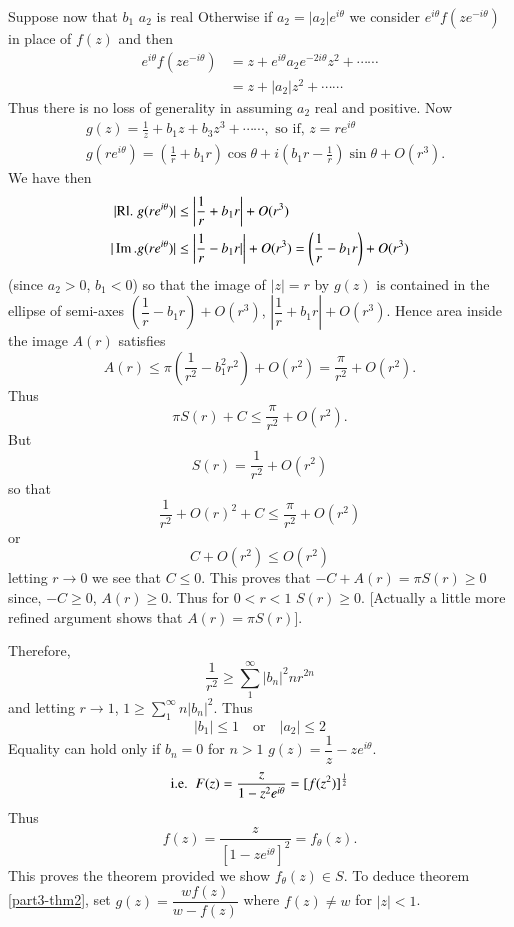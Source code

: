 Suppose now that $b_{1}$ \ie $a_{2}$ is real Otherwise if
$a_{2}=|a_{2}|e^{i\theta}$ we consider $e^{i\theta}f(ze^{-i\theta})$
in place of $f(z)$ and then
\begin{align*}
e^{i\theta}f(ze^{-i\theta})
&=z+e^{i\theta}a_{2}e^{-2i\theta}z^{2}+\cdots\cdots\\
&= z+|a_{2}|z^{2}+\cdots\cdots
\end{align*}
Thus there is no loss of generality in assuming $a_{2}$ real and
positive. Now 
\begin{align*}
& g(z)=\frac{1}{z}+b_{1}z+b_{3}z^{3}+\cdots\cdots,\text{ \  so if, \ }
  z=re^{i\theta}\\
&
  g(re^{i\theta})=\left(\frac{1}{r}+b_{1}r\right)\cos\theta+i\left(b_{1}r-\frac{1}{r}\right)\sin \theta+O(r^{3}).
\end{align*}
We have then
\begin{align*}
|\text{Rl.\;}g(re^{i\theta})| &\leq \left|\frac{1}{r}+b_{1}r \right|+O(r^{3})\\
|\operatorname{Im}. g(re^{i\theta})| &\leq
\left|\frac{1}{r}-b_{1}r
|\right|+O(r^{3})=\left(\frac{1}{r}-b_{1}r\right)+ O(r^{3}) 
\end{align*}
(since $a_{2}>0$, $b_{1}<0$)
so that the image of $|z|=r$ by $g(z)$ is contained in the ellipse of
semi-axes $\left(\dfrac{1}{r}-b_{1}r\right)+O(r^{3})$,
$|\dfrac{1}{r}+b_{1}r|+O(r^{3})$. Hence area inside the image $A(r)$
satisfies
$$
A(r)\leq
\pi\left(\frac{1}{r^{2}}-b^{2}_{1} r^{2}\right) +
O(r^{2})=\frac{\pi}{r^{2}}+O(r^{2}). 
$$
Thus\pageoriginale
$$
\pi S(r)+C\leq \frac{\pi}{r^{2}}+O(r^{2}).
$$
But
$$
S(r)=\frac{1}{r^{2}}+O(r^{2})
$$
so that
$$
\frac{1}{r^{2}}+O(r)^{2}+C\leq \frac{\pi}{r^{2}}+O(r^{2})
$$
or
$$
C+O(r^{2})\leq O(r^{2})
$$
letting $r\to 0$ we see that $C\leq 0$. This proves that $-C+A(r)=\pi
S(r)\geq 0$ since, $-C\geq 0$, $A(r)\geq 0$. Thus for $0<r<1$\; $S(r)\geq
0$. [Actually a little more refined argument shows that $A(r)=\pi
  S(r)$].

Therefore,
$$
\frac{1}{r^{2}}\geq \sum^{\infty}_{1}|b_{n}|^{2}nr^{2n}
$$
and letting $r\to 1$, $1\geq
\sum\limits^{\infty}_{1}n|b_{n}|^{2}$. Thus
$$
|b_{1}|\leq 1\quad\text{or}\quad |a_{2}|\leq 2
$$
Equality can hold only if $b_{n}=0$ for $n>1$ \ie
$g(z)=\dfrac{1}{z}-ze^{i\theta}$. 
$$
\text{{i.e.}\kern.3em\ }
F(z)=\frac{z}{1-z^{2}e^{i\theta}}=[f(z^{2})]^{\frac{1}{2}}
$$
Thus
$$
f(z)=\frac{z}{[1-ze^{i\theta}]^{2}}=f_{\theta}(z).
$$
This proves the theorem provided we show $f_{\theta}(z)\in S$. To
deduce theorem \ref{part3-thm2}, set $g(z)=\dfrac{wf(z)}{w-f(z)}$
where $f(z)\neq w$ for $|z|<1$.

